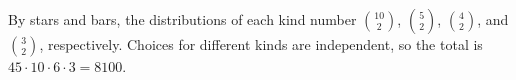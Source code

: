 By stars and bars, the distributions of each kind number $\binom{10}{2}$, $\binom52$, $\binom42$, and $\binom32$, respectively. Choices for different kinds are independent, so the total is $45\cdot10\cdot6\cdot3=\boxed{8100}$.
